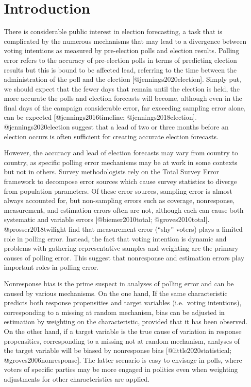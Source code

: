 \documentclass[
  letterpaper,
  DIV=11,
  numbers=noendperiod]{scrartcl}
\author{}
\date{}
\begin{document}
\section{Introduction}\label{introduction}

There is considerable public interest in election forecasting, a task
that is complicated by the numerous mechanisms that may lead to a
divergence between voting intentions as measured by pre-election polls
and election results. Polling error refers to the accuracy of
pre-election polls in terms of predicting election results but this is
bound to be affected lead, referring to the time between the
administration of the poll and the election {[}@jennings2020election{]}.
Simply put, we should expect that the fewer days that remain until the
election is held, the more accurate the polls and election forecasts
will become, although even in the final days of the campaign
considerable error, far exceeding sampling error alone, can be expected
{[}@jennings2016timeline; @jennings2018election{]}.
@jennings2020election suggest that a lead of two or three months before
an election occurs is often sufficient for creating accurate election
forecasts.

However, the accuracy and lead of election forecasts may vary from
country to country, as specific polling error mechanisms may be at work
in some contexts but not in others. Survey methodologists rely on the
Total Survey Error framework to decompose error sources which cause
survey statistics to diverge from population parameters. Of these error
sources, sampling error is almost always accounted for, but non-sampling
errors such as coverage, nonresponse, measurement, and estimation errors
often are not, although each can cause both systematic and variable
errors {[}@biemer2010total; @groves2010total{]}. @prosser2018twilight
find that measurement error (``shy'' voters) plays a limited role in
polling error. Instead, the fact that voting intention is dynamic and
problems with gathering representative samples and weighting are the
primary causes of polling error. This suggest that nonresponse and
estimation errors play important roles in polling error.

Nonresponse bias is the prime suspect in analyses of polling error and
can be caused by various mechanisms. On the one hand, If the same
characteristic predicts both response propensities and target variables
(i.e.~voting intentions), corresponding to a missing at random
mechanism, bias can be adjusted in estimation by weighting on the
characteristic, provided that it has been observed. On the other hand,
if a target variable is the true cause of variation in response
propensities, corresponding to a missing not at random mechanism,
analyses of the target variable will be biased by nonresponse bias
{[}@little2020statistical; @groves2006nonresponse{]}. The latter
scenario is easy to envisage in polls, where voters of specific parties
may be more engaged in politics even when weighting adjustments for
other characteristics are applied.
\end{document}
